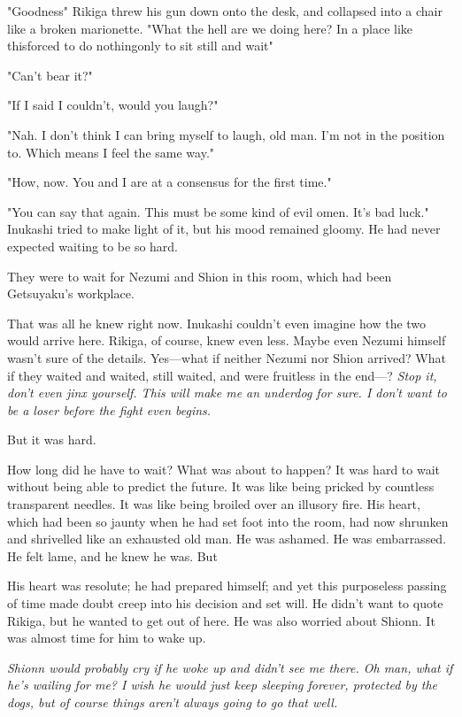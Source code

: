 "Goodness\el " Rikiga threw his gun down onto the desk, and collapsed
into a chair like a broken marionette. "What the hell are we doing here?
In a place like this\el forced to do nothing\el only to sit still and
wait\el "

"Can't bear it?"

"If I said I couldn't, would you laugh?"

"Nah. I don't think I can bring myself to laugh, old man. I'm not in the
position to. Which means I feel the same way."

"How, now. You and I are at a consensus for the first time."

"You can say that again. This must be some kind of evil omen. It's bad
luck." Inukashi tried to make light of it, but his mood remained gloomy.
He had never expected waiting to be so hard.

They were to wait for Nezumi and Shion in this room, which had been
Getsuyaku's workplace.

That was all he knew right now. Inukashi couldn't even imagine how the
two would arrive here. Rikiga, of course, knew even less. Maybe even
Nezumi himself wasn't sure of the details. Yes---what if neither Nezumi
nor Shion arrived? What if they waited and waited, still waited, and
were fruitless in the end---? \emph{Stop it, don't even jinx yourself. This will
make me an underdog for sure. I don't want to be a loser before the
fight even begins.}

But it was hard.

How long did he have to wait? What was about to happen? It was hard to
wait without being able to predict the future. It was like being pricked
by countless transparent needles. It was like being broiled over an
illusory fire. His heart, which had been so jaunty when he had set foot
into the room, had now shrunken and shrivelled like an exhausted old
man. He was ashamed. He was embarrassed. He felt lame, and he knew he
was. But\el 

His heart was resolute; he had prepared himself; and yet this
purposeless passing of time made doubt creep into his decision and set
will. He didn't want to quote Rikiga, but he wanted to get out of here.
He was also worried about Shionn. It was almost time for him to wake up.

\emph{Shionn would probably cry if he woke up and didn't see me there. Oh man,
what if he's wailing for me? I wish he would just keep sleeping forever,
protected by the dogs, but of course things aren't always going to go
that well.}

